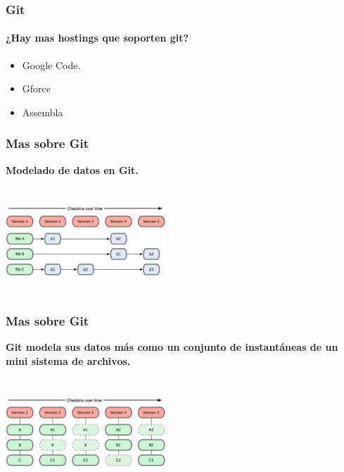 \documentclass{beamer}
\begin{document}
	\begin{frame}
		\frametitle{Git}
		\framesubtitle{¿Hay mas hostings que soporten git?}
		\begin{itemize}	
			\item Google Code.
			\item Gforce
			\item Assembla
		\end{itemize}
	\end{frame}
	\begin{frame}
		\frametitle{Mas sobre Git}
		\textbf{ Modelado de datos en Git.}\\
		\begin{center}
			\includegraphics[width=6cm,height=4cm]{imagen1.png}
		\end{center}
	\end{frame}

	\begin{frame}
		\frametitle{Mas sobre Git}
		\textbf{Git modela sus datos más como un conjunto de instantáneas de un mini sistema de archivos.}\\
		\begin{center}
			\includegraphics[width=6cm,height=4cm]{imagentxt.png}
		\end{center}
	\end{frame}	
\end{document}
